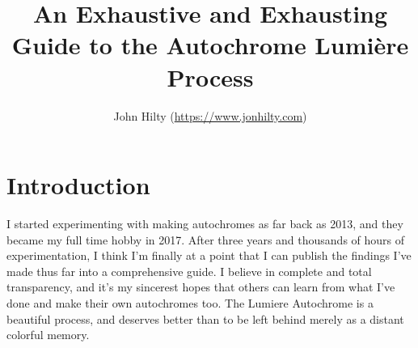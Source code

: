 \documentclass[11pt]{article}
\title{\textbf{An Exhaustive and Exhausting Guide to the Autochrome Lumière Process}}
\author{John Hilty (\url{https://www.jonhilty.com})}
\date{}
\begin{document}
\maketitle

\section{Introduction}

I started experimenting with making autochromes as far back as 2013, and they became my full time hobby in 2017. After three years and thousands of hours of experimentation, I think I'm finally at a point that I can publish the findings I've made thus far into a comprehensive guide. I believe in complete and total transparency, and it's my sincerest hopes that others can learn from what I've done and make their own autochromes too. The Lumiere Autochrome is a beautiful process, and deserves better than to be left behind merely as a distant colorful memory.\newline
\end{document}
